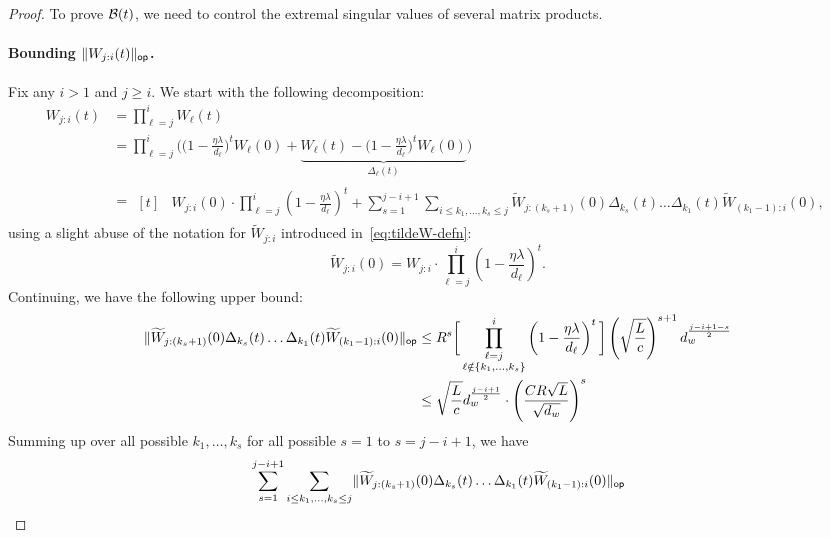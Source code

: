 \begin{proof}
  To prove $\mathcal{B}(t)$, we need to control the extremal singular values of several matrix products.

  \paragraph{Bounding $\lVert W_{j:i}(t)\rVert_{\mathsf{op}}$.}
  Fix any $i > 1$ and $j \geq i$. We start with the following decomposition:
  \begin{align*}
    W_{j:i}(t) &=
    \prod_{\ell = j}^{i} W_{\ell}(t) \\ 
               &=
               \prod_{\ell=j}^{i} \bigg( \Big( 1 - \frac{\eta \lambda}{d_{\ell}} \Big)^{t} W_{\ell}(0) + \underbrace{W_{\ell}(t) - \Big(1 - \frac{\eta \lambda}{d_{\ell}}\Big)^{t} W_{\ell}(0)}_{\Delta_{\ell}(t)} \bigg) \\
               &= \begin{aligned}[t]
      & W_{j:i}(0) \cdot \prod_{\ell = j}^{i} \left(1 - \frac{\eta \lambda}{d_{\ell}}\right)^{t}  + \sum_{s = 1}^{j - i + 1} \sum_{i \leq k_{1}, \dots, k_{s} \leq j} \widetilde{W}_{j:(k_{s} + 1)}(0) \Delta_{k_s}(t) \dots \Delta_{k_1}(t) \widetilde{W}_{(k_1 - 1):i}(0),
      \end{aligned}
  \end{align*}
  using a slight abuse of the notation for $\widetilde{W}_{j:i}$ introduced in~\eqref{eq:tildeW-defn}:
  \[
    \widetilde{W}_{j:i}(0) = W_{j:i} \cdot \prod_{\ell = j}^{i} \left(1 - \frac{\eta \lambda}{d_{\ell}}\right)^{t}.
  \]
  Continuing, we have the following upper bound:
  \begin{align*}
     \lVert\widetilde{W}_{j:(k_{s}+1)}(0) \Delta_{k_{s}}(t) \dots \Delta_{k_{1}}(t) \widetilde{W}_{(k_1 - 1):i}(0)\rVert_{\mathsf{op}} &\leq
    R^{s}
    \bigg[ \prod_{\substack{\ell = j\\\ell \notin \{k_{1}, \dots, k_{s}\}}}^{i} \left(1 - \frac{\eta \lambda}{d_{\ell}}\right)^{t} \bigg]
    \left( \sqrt{\frac{L}{c}}\right)^{s + 1} d_{w}^{\frac{j - i + 1 - s}{2}} \\
    &\leq
     \sqrt{\frac{L}{c}} d_{w}^{\frac{j - i + 1}{2}} \cdot
    \left( \frac{C R \sqrt{L}}{\sqrt{d_w}} 
     \right)^{s} 
  \end{align*}
  Summing up over all possible $k_{1}, \dots, k_{s}$ for all possible $s = 1$ to $s = j - i + 1$,
  we have
  \begin{align*}
      & \sum_{s = 1}^{j - i + 1} \sum_{i \leq k_{1}, \dots, k_{s} \leq j} \opnorm{ \widetilde{W}_{j:(k_{s} + 1)}(0) \Delta_{k_s}(t) \dots \Delta_{k_1}(t) \widetilde{W}_{(k_1 - 1):i}(0)} \\

\end{align*}
\end{proof}
